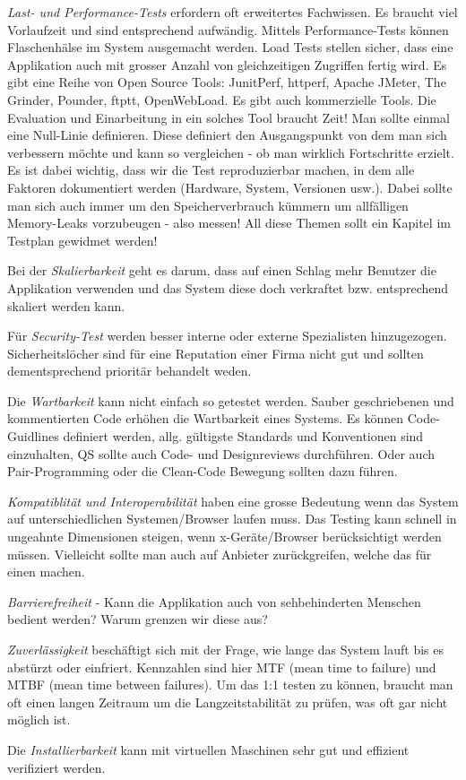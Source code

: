 \begin{description}
	\emph{Last- und Performance-Tests} erfordern oft erweitertes Fachwissen. Es braucht viel Vorlaufzeit und sind entsprechend aufwändig. Mittels Performance-Tests können Flaschenhälse im System ausgemacht werden. Load Tests stellen sicher, dass eine Applikation auch mit grosser Anzahl von gleichzeitigen Zugriffen fertig wird. Es gibt eine Reihe von Open Source Tools: JunitPerf, httperf, Apache JMeter, The Grinder, Pounder, ftptt, OpenWebLoad. Es gibt auch kommerzielle Tools. Die Evaluation und Einarbeitung in ein solches Tool braucht Zeit! Man sollte einmal eine Null-Linie definieren. Diese definiert den Ausgangspunkt von dem man sich verbessern möchte und kann so vergleichen - ob man wirklich Fortschritte erzielt. Es ist dabei wichtig, dass wir die Test reproduzierbar machen, in dem alle Faktoren dokumentiert werden (Hardware, System, Versionen usw.). Dabei sollte man sich auch immer um den Speicherverbrauch kümmern um allfälligen Memory-Leaks vorzubeugen - also messen! All diese Themen sollt ein Kapitel im Testplan gewidmet werden!
	
	Bei der \emph{Skalierbarkeit} geht es darum, dass auf einen Schlag mehr Benutzer die Applikation verwenden und das System diese doch verkraftet bzw. entsprechend skaliert werden kann.
	
	Für \emph{Security-Test} werden besser interne oder externe Spezialisten hinzugezogen. Sicherheitslöcher sind für eine Reputation einer Firma nicht gut und sollten dementsprechend prioritär behandelt weden.
	
	Die \emph{Wartbarkeit} kann nicht einfach so getestet werden. Sauber geschriebenen und kommentierten Code erhöhen die Wartbarkeit eines Systems. Es können Code-Guidlines definiert werden, allg. gültigste Standards und Konventionen sind einzuhalten, QS sollte auch Code- und Designreviews durchführen. Oder auch Pair-Programming oder die Clean-Code Bewegung sollten dazu führen.
	
	\emph{Kompatiblität und Interoperabilität} haben eine grosse Bedeutung wenn das System auf unterschiedlichen Systemen/Browser laufen muss. Das Testing kann schnell in ungeahnte Dimensionen steigen, wenn x-Geräte/Browser berücksichtigt werden müssen. Vielleicht sollte man auch auf Anbieter zurückgreifen, welche das für einen machen.
	
	\emph{Barrierefreiheit} - Kann die Applikation auch von sehbehinderten Menschen bedient werden? Warum grenzen wir diese aus?
	
	\emph{Zuverlässigkeit} beschäftigt sich mit der Frage, wie lange das System lauft bis es abstürzt oder einfriert. Kennzahlen sind hier MTF (mean time to failure) und MTBF (mean time between failures). Um das 1:1 testen zu können, braucht man oft einen langen Zeitraum um die Langzeitstabilität zu prüfen, was oft gar nicht möglich ist.
	
	Die \emph{Installierbarkeit} kann mit virtuellen Maschinen sehr gut und effizient verifiziert werden.
	 
\end{description}

